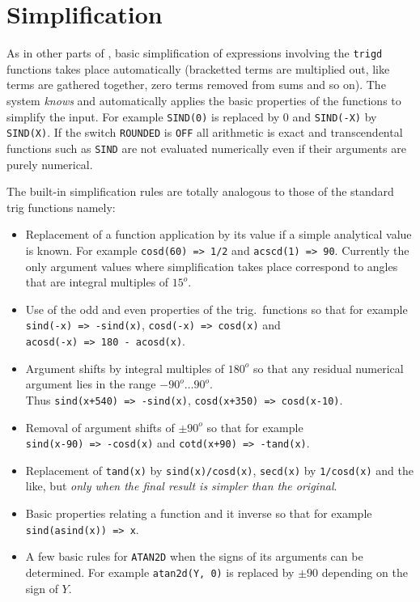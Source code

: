 \section{Simplification}
As in other parts of {\REDUCE}, basic simplification of expressions involving the \texttt{trigd} functions takes place automatically (bracketted terms are multiplied out, like terms are gathered together, zero terms removed from sums and so on).  The system {\it knows} and automatically applies the basic properties of the functions to simplify the input.   For example \texttt{SIND(0)} is replaced by 0 and \texttt{SIND(-X)} by \texttt{SIND(X)}.  If the switch \texttt{ROUNDED} is \texttt{OFF} all arithmetic is exact and transcendental functions  such as \texttt{SIND} are not evaluated numerically even if their arguments are purely numerical.

The built-in simplification rules are totally analogous to those of the standard trig functions namely:
\begin{itemize}
\item  Replacement of a function application by its value if a simple analytical value is known. For example \texttt{cosd(60) => 1/2} and \texttt{acscd(1) => 90}. Currently the only argument values where simplification takes place correspond  to angles that are integral multiples of $15^o$.
\item Use of the odd and even properties of the trig.\ functions so that for example 
\texttt{sind(-x) => -sind(x)}, \texttt{cosd(-x) => cosd(x)}  and \\
\texttt{acosd(-x) => 180 - acosd(x)}. 
\item  Argument shifts by integral multiples of $180^o$ so that any residual numerical argument  lies in the range $-90^o \ldots  90^o$.  \\
Thus \texttt{sind(x+540) => -sind(x)}, \texttt{cosd(x+350) => cosd(x-10)}.
\item  Removal of argument shifts of $\pm 90^o$ so that for example \\
 \texttt{sind(x-90) => -cosd(x)} and  \texttt{cotd(x+90) => -tand(x)}.
\item Replacement of \texttt{tand(x)} by \texttt{sind(x)/cosd(x)}, \texttt{secd(x)} by \texttt{1/cosd(x)} and the like, but \emph{only when the final result is simpler than the original}.
\item Basic properties relating a function and it inverse so that for example \\
\texttt{sind(asind(x)) => x}.
\item A few basic rules for \texttt{ATAN2D} when the signs of its arguments can be determined. For example \texttt{atan2d(Y, 0)} is replaced by $\pm 90$ depending on the sign of $Y$.
\end{itemize}

